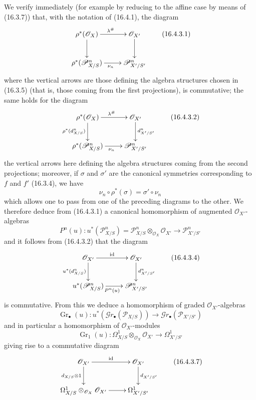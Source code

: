 \begin{env}[16.4.3]
\label{IV.16.4.3}
We verify immediately (for example by reducing to the affine case by means of
(16.3.7)) that, with the notation of (16.4.1), the diagram
\[
  \xymatrix{
    \rho^*(\mathcal{O}_X) \ar[r]^{\lambda^\#} \ar[d] &
      \mathcal{O}_{X'} \ar[d] \\
    \rho^*(\mathscr{P}_{X/S}^n) \ar[r]_{\nu_n} &
      \mathscr{P}_{X'/S'}^n
  }
  \tag{16.4.3.1}
  \label{IV.16.4.3.1}
\]
where the vertical arrows are those defining the algebra structures
chosen in (16.3.5) (that is, those coming from the first projections),
is commutative; the same holds for the diagram
\[
  \xymatrix{
    \rho^*(\mathcal{O}_X) \ar[r]^{\lambda^\#}
      \ar[d]_{\rho^*(d_{X/S}^n)} &
      \mathcal{O}_{X'} \ar[d]^{d_{X'/S'}^n} \\
    \rho^*(\mathscr{P}_{X/S}^n) \ar[r]_{\nu_n} &
      \mathscr{P}_{X'/S'}^n
  }
  \tag{16.4.3.2}
  \label{IV.16.4.3.2}
\]
the vertical arrows here defining the algebra structures coming from the
second projections; moreover, if $\sigma$ and $\sigma'$ are the canonical
symmetries corresponding to $f$ and $f'$ (16.3.4), we have
\[
  \nu_n\circ\rho^*(\sigma)=\sigma'\circ\nu_n
\]
which allows one to pass from one of the preceding diagrams to the other. We
therefore deduce from (16.4.3.1) a canonical homomorphism of augmented
$\mathcal{O}_{X'}$-algebras
\[
  P^n(u):u^*(\mathscr{P}_{X/S}^n)
  =\mathscr{P}_{X/S}^n\otimes_{\mathcal{O}_X}\mathcal{O}_{X'}
  \longrightarrow\mathscr{P}_{X'/S'}^n
  \tag{16.4.3.3}
  \label{IV.16.4.3.3}
\]
and it follows from (16.4.3.2) that the diagram
\[
  \xymatrix{
    \mathcal{O}_{X'} \ar[r]^{\operatorname{id}}
      \ar[d]_{u^*(d_{X/S}^n)} &
      \mathcal{O}_{X'} \ar[d]^{d_{X'/S'}^n} \\
    u^*(\mathscr{P}_{X/S}^n) \ar[r]_{P^n(u)} &
      \mathscr{P}_{X'/S'}^n
  }
  \tag{16.4.3.4}
  \label{IV.16.4.3.4}
\]
is commutative. From this we deduce a homomorphism of graded
$\mathcal{O}_{X'}$-algebras
\[
  \operatorname{Gr}_\bullet(u):u^*(\mathscr{G}r_\bullet(\mathscr{P}_{X/S}))
  \longrightarrow\mathscr{G}r_\bullet(\mathscr{P}_{X'/S'})
  \tag{16.4.3.5}
  \label{IV.16.4.3.5}
\]
and in particular a homomorphism of $\mathcal{O}_{X'}$-modules
\[
  \operatorname{Gr}_1(u):
  \Omega_{X/S}^1\otimes_{\mathcal{O}_X}\mathcal{O}_{X'}
  \longrightarrow\Omega_{X'/S'}^1
  \tag{16.4.3.6}
  \label{IV.16.4.3.6}
\]
giving rise to a commutative diagram
\[
  \xymatrix{
    \mathcal{O}_{X'} \ar[r]^{\operatorname{id}}
      \ar[d]_{d_{X/S}\otimes 1} &
      \mathcal{O}_{X'} \ar[d]^{d_{X'/S'}} \\
    \Omega_{X/S}^1\otimes_{\mathcal{O}_X}\mathcal{O}_{X'} \ar[r] &
      \Omega_{X'/S'}^1
  }
  \tag{16.4.3.7}
  \label{IV.16.4.3.7}
\]
\end{env}

